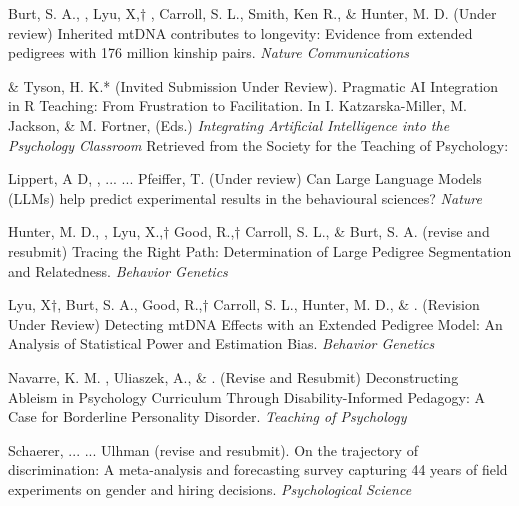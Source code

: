 
\item Burt, S. A., \meb, Lyu, X,$\dagger$ \joe, Carroll, S. L., Smith, Ken R., \& Hunter, M. D. (Under review) Inherited mtDNA contributes to longevity: Evidence from extended pedigrees with 176 million kinship pairs. \textit{Nature Communications}%

\item \meb \& Tyson, H. K.* (Invited Submission Under Review). Pragmatic AI Integration in R Teaching: From Frustration to Facilitation.  In I. Katzarska-Miller, M. Jackson, \& M. Fortner,  (Eds.) \textit{Integrating Artificial Intelligence into the Psychology Classroom} Retrieved from the Society for the Teaching of Psychology: \href{http://teachpsych.org/ebooks/}{\small\color{blue}{teachpsych.org/ebooks/}}

\item Lippert, A D, , ... \meb ... Pfeiffer, T. (Under review) Can Large Language Models (LLMs) help predict experimental results in the behavioural sciences? \textit{Nature}

\item Hunter, M. D., \meb, Lyu, X.,$\dagger$ Good, R.,$\dagger$ Carroll, S. L., \& Burt, S. A. (revise and resubmit) Tracing the Right Path: Determination of Large Pedigree Segmentation and Relatedness. \textit{Behavior Genetics}

\item Lyu, X$\dagger$, Burt, S. A., Good, R.,$\dagger$ Carroll, S. L.,  Hunter, M. D., \& \meb. (Revision Under Review) Detecting mtDNA Effects with an Extended Pedigree Model: An Analysis of Statistical Power and Estimation Bias. %
\textit{Behavior Genetics}

\item Navarre, K. M. \noteB, Uliaszek, A., \& \meb. (Revise and Resubmit) Deconstructing Ableism in Psychology Curriculum Through Disability-Informed Pedagogy: A Case for Borderline Personality Disorder. \textit{Teaching of Psychology}

\item Schaerer, ... \meb ... Ulhman (revise and resubmit). On the trajectory of discrimination: A meta-analysis and forecasting survey capturing 44 years of field experiments on gender and hiring decisions. \textit{Psychological Science}

